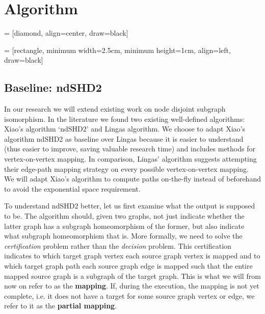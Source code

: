 \chapter{Algorithm}

 = [diamond, align=center, draw=black]

 = [rectangle, minimum width=2.5cm, minimum height=1cm, align=left, draw=black]


\section{Baseline: ndSHD2}
In our research we will extend existing work on node disjoint subgraph isomorphism. In the literature we found two existing well-defined algorithms: Xiao's algorithm `ndSHD2'\cite{XIAONODEDISJOINT} and Lingas algorithm\cite{LINGAS2009464}. We choose to adapt Xiao's algorithm ndSHD2 as baseline over Lingas because it is easier to understand (thus easier to improve, saving valuable research time) and includes methods for vertex-on-vertex mapping. In comparison, Lingas' algorithm suggests attempting their edge-path mapping strategy on every possible vertex-on-vertex mapping. We will adapt Xiao's algorithm to compute paths on-the-fly instead of beforehand to avoid the exponential space requirement.

To understand ndSHD2 better, let us first examine what the output is supposed to be. The algorithm should, given two graphs, not just indicate whether the latter graph has a subgraph homeomorphism of the former, but also indicate what subgraph homeomorphism that is. More formally, we need to solve the \textit{certification} problem rather than the \textit{decision} problem. This certification indicates to which target graph vertex each source graph vertex is mapped and to which target graph path each source graph edge is mapped such that the entire mapped source graph is a subgraph of the target graph. This is what we will from now on refer to as the \textbf{mapping}. If, during the execution, the mapping is not yet complete, i.e. it does not have a target for some source graph vertex or edge, we refer to it as the \textbf{partial mapping}.

